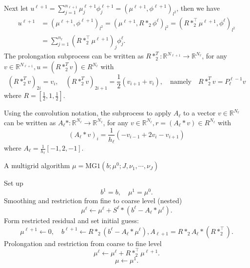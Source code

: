 Next 
let $u^{\ell+1}=\sum\limits_{j=1}^{n_{\ell+1}}\mu_{j}^{\ell+1}\phi^{\ell+1}_{j}
=(  \mu^{\ell+1}, \phi^{\ell+1})_{l^2}$, then we have
\begin{equation}
\begin{split}
u^{\ell+1}&=( \mu^{\ell+1}, \phi^{\ell+1})_{l^2}
=( \mu^{\ell+1}, R\ast_2\phi^{\ell})_{l^2}=(R\ast_2^{\top} \mu^{\ell+1}, \phi^{\ell})_{l^2}\\
&=\sum\limits_{j=1}^{n_{\ell}}\left(R\ast_2^{\top} \mu^{\ell+1}\right)_{j}\phi^{\ell}_{j}.
\end{split}
\end{equation}
The prolongation subprocess can be written as 
$R\ast_2^T: \mathbb R^{N_{\ell+1}}\rightarrow \mathbb R^{N_\ell}$, for any $v\in \mathbb R^{N_{\ell+1}}, u=(R\ast_2^T v)\in R^{N_\ell}$ with
$$
(R\ast_2^T v)_{2i}=v_i,\quad (R\ast_2^T v)_{2i+1}=\frac 12 (v_{i+1} +v_i),\quad  \mbox{namely}\quad R\ast_2^Tv=P^{\ell-1}_\ell v
$$
where $R=[\frac 12,1,\frac12]$.

Using the convolution notation, the subprocess to apply $A_\ell$ to 
a vector $v\in \mathbb R^{N_\ell}$ can be written as
$A_\ell\ast: \mathbb R^{N_\ell}\rightarrow \mathbb R^{N_\ell}$, for any $v\in \mathbb R^{N_\ell}, r=(A_\ell\ast v)\in R^{N_\ell}$ with
$$
(A_\ell\ast v)_{i}=\frac{1}{h_\ell}( -v_{i-1}+2v_i-v_{i+1})
$$
where $A_\ell=\frac{1}{h_\ell}[-1,2,-1]$.

\newpage

\begin{breakablealgorithm}%
	\caption{A multigrid algorithm $\mu = {\text{MG1}}(b; \mu^0; J,\nu_1, \cdots, \nu_J)$}
\label{alg:L-Slash11dm}
\begin{algorithmic}
	\State Set up
		$$
		b^1 = b, \quad \mu^{1}=\mu^0. 
		$$
		\State Smoothing and restriction from fine to coarse level (nested)
		\State
		\begin{equation}\label{eq:smoothing}
		\mu^{\ell} \leftarrow \mu^{\ell} + S^\ell \ast (b^\ell - A_\ell \ast \mu^{\ell}).
		\end{equation}
		\EndFor
		\State Form restricted residual and set initial guess:
		$$
		\mu^{\ell+1} \leftarrow 0, \quad b^{\ell+1} \leftarrow R \ast_2 (b^\ell -  A_\ell \ast \mu^{\ell}), A_{\ell+1} = R       \ast_2 A_\ell \ast (R\ast_2^\top).
		$$
		\EndFor
		\State Prolongation and restriction from coarse to fine level
		\State
		$$
		\mu^{\ell} \leftarrow \mu^{\ell} + R  \ast_2^{\top} \mu^{\ell+1}.
		$$
		\EndFor
		\State
		$$
		\mu \leftarrow \mu^{1}.
		$$
	\end{algorithmic}
\end{breakablealgorithm}


